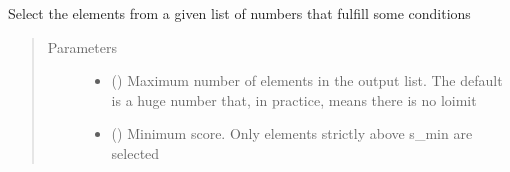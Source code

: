 \documentclass[letterpaper,10pt,english]{sphinxmanual}
\begin{document}
\begin{fulllineitems}
\begin{fulllineitems}
\begin{quote}
\begin{description}
\begin{itemize}
\end{itemize}


\end{description}\end{quote}

\end{fulllineitems}


\begin{fulllineitems}
\label{\detokenize{dc_preprocessor:src.domain_classifier.preprocessor.CorpusProcessor.get_top_scores}}
\sphinxAtStartPar
Select the elements from a given list of numbers that fulfill some
conditions
\begin{quote}\begin{description}
\item[{Parameters}] \leavevmode\begin{itemize}
\item {} 
\sphinxAtStartPar
{} () \textendash{} Maximum number of elements in the output list. The default is
a huge number that, in practice, means there is no loimit

\item {} 
\sphinxAtStartPar
{} () \textendash{} Minimum score. Only elements strictly above s\_min are selected

\end{itemize}

\end{description}\end{quote}

\end{fulllineitems}



\end{fulllineitems}
\end{document}
